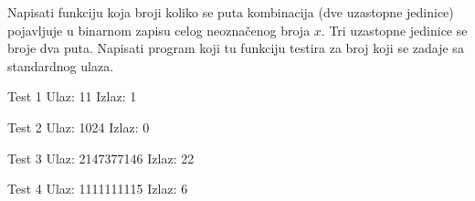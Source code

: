 \begin{Exercise}[label=208]
Napisati funkciju koja broji koliko se puta kombinacija
   (dve uzastopne jedinice) pojavljuje u binarnom zapisu
  celog neoznačenog broja $x$. Tri uzastopne jedinice se broje
  dva puta.  Napisati program koji tu funkciju testira za broj koji se
  zadaje sa standardnog ulaza.
  
\begin{minitest}
\begin{test}{Test 1}
Ulaz:   11  
Izlaz:  1    
\end{test}
\end{minitest}
\begin{minitest}
\begin{test}{Test 2}
Ulaz:   1024
Izlaz:  0 
\end{test}
\end{minitest}
\begin{minitest}
\begin{test}{Test 3}
Ulaz:   2147377146
Izlaz:  22
\end{test}
\end{minitest}

\begin{minitest}
\begin{test}{Test 4}
Ulaz:   1111111115
Izlaz:  6 
\end{test}
\end{minitest}

\end{Exercise}
\begin{Answer}[ref=208]
\end{Answer}


